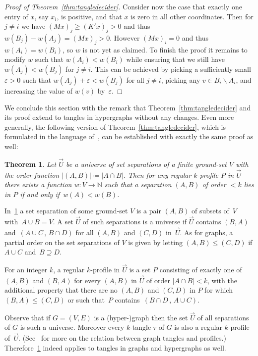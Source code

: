 \documentclass[11pt]{article}
\newtheorem{THM}{Theorem}
\theoremstyle{definition}
\newcommand{\N}{\mathbb{N}}
\def\sm{\smallsetminus}
\newcommand{\abs}[1]{\left |#1\right |}
\begin{document}
\begin{proof}[Proof of Theorem~\ref{thm:tangledecider}]
	Consider now the case that exactly one entry of $ x $, say $ x_i $, is positive, and that $ x $ is zero in all other coordinates. Then for $ j\ne i $ we have $ (Mx)_j\ge(K'x)_j>0 $ and thus $ w(B_j)-w(A_j)=(Mx)_j>0 $. However $ (Mx)_i=0 $ and thus $ w(A_i)=w(B_i) $, so $ w $ is not yet as claimed. To finish the proof it remains to modify $ w $ such that $ w(A_i)<w(B_i) $ while ensuring that we still have $ w(A_j)<w(B_j) $ for $ j\ne i $. This can be achieved by picking a sufficiently small $ \varepsilon>0 $ such that $ {w(A_j)+\varepsilon<w(B_j)} $ for all $ j\ne i $, picking any $ {v\in B_i\sm A_i }$, and increasing the value of $ w(v) $ by~$ \varepsilon $.	
\end{proof}

We conclude this section with the remark that Theorem~\ref{thm:tangledecider} and its proof extend to tangles in hypergraphs without any changes. Even more generally, the following version of Theorem~\ref{thm:tangledecider}, which is formulated in the language of~\cite{ProfilesNew}, can be established with exactly the same proof as well:

\begin{THM}\label{thm:profiledecider}
    Let $ \vec{U} $ be a universe of set separations of a finite ground-set $ V $ with the order function $ \abs{(A,B)}\coloneqq\abs{A\cap B} $. Then for any regular $ k $-profile $ P $ in $ \vec{U} $ there exists a function $ w\colon V\!\to\N $ such that a separation $ (A,B) $ of order $ {<k} $ lies in $ P $ if and only if~$ w(A)<w(B) $.
\end{THM}

In~\cref{thm:profiledecider} a set separation of some ground-set $ V $ is a pair $ (A,B) $ of subsets of~$ V $ with~$ A\cup B=V $. A set $ \vec{U} $ of such separations is a universe if $ \vec{U} $ contains $ (B,A) $ and~$ (A\cup C\,,\,B\cap D) $ for all $ (A,B) $ and $ (C,D) $ in~$ \vec{U} $. As for graphs, a partial order on the set separations of $ V $ is given by letting $ (A,B)\le(C,D) $ if $ A\cup C $ and~$ B\supseteq D $.

For an integer $ k $, a regular $ k $-profile in $ \vec{U} $ is a set $ P $ consisting of exactly one of $ (A,B) $ and $ (B,A) $ for every $ (A,B) $ in $ \vec{U} $ of order $ \abs{A\cap B} < k $, with the additional property that there are no $ (A,B) $ and $ (C,D) $ in $ P $ for which $ (B,A)\le(C,D) $ or such that~$ P $ contains~$ (B\cap D\,,\,A\cup C) $.

Observe that if $ G=(V,E) $ is a (hyper-)graph then the set $ \vec{U} $ of all separations of $ G $ is such a universe. Moreover every $ k $-tangle $ \tau $ of $ G $ is also a regular $ k $-profile of~$ \vec{U} $. (See~\cite{ProfilesNew} for more on the relation between graph tangles and profiles.) Therefore~\cref{thm:profiledecider} indeed applies to tangles in graphs and hypergraphs as well.
\end{document}
